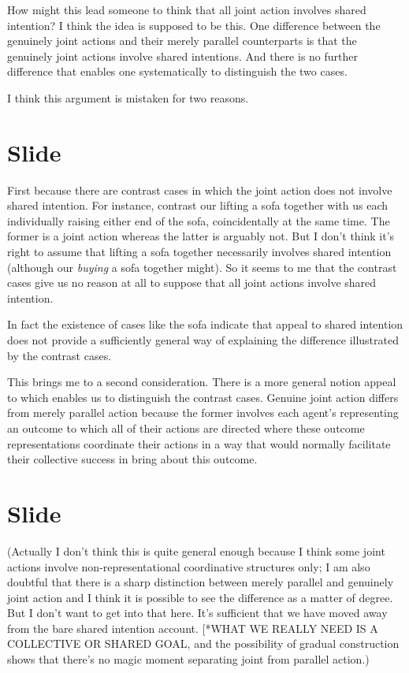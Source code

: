 \documentclass[12pt,\papersize]{extarticle}
\begin{document}
How might this lead someone to think that all joint action involves shared intention?
I think the idea is supposed to be this.
One difference between the genuinely joint actions and their merely parallel counterparts is that the genuinely joint actions involve shared intentions.
And there is no further difference that enables one systematically to distinguish the two cases.

I think this argument is mistaken for two reasons.


\section{Slide}
First because there are contrast cases in which the joint action does not involve shared intention.
For instance, contrast our lifting a sofa together with us each individually raising either end of the sofa, coincidentally at the same time.
The former is a joint action whereas the latter is arguably not.
But I don't think it's right to assume that lifting a sofa together necessarily involves shared intention (although our \emph{buying} a sofa together might).
So it seems to me that the contrast cases give us no reason at all to suppose that all joint actions involve shared intention.

In fact the existence of cases like the sofa indicate that appeal to shared intention does not provide a sufficiently general way of explaining the difference illustrated by the contrast cases.

This brings me to a second consideration.
There is a more general notion appeal to which enables us to distinguish the contrast cases.
Genuine joint action differs from merely parallel action because the former involves each agent’s representing an outcome to which all of their actions are directed where these outcome representations coordinate their actions in a way that would normally facilitate their collective success in bring about this outcome.



\section{Slide}
(Actually I don’t think this is quite general enough because I think some joint actions involve non-representational coordinative structures only; I am also doubtful that there is a sharp distinction between merely parallel and genuinely joint action and I think it is possible to see the difference as a matter of degree. But I don’t want to get into that here.  It’s sufficient that we have moved away from the bare shared intention account. [*WHAT WE REALLY NEED IS A COLLECTIVE OR SHARED GOAL, and the possibility of gradual construction shows that there’s no magic moment separating joint from parallel action.)
\end{document}
